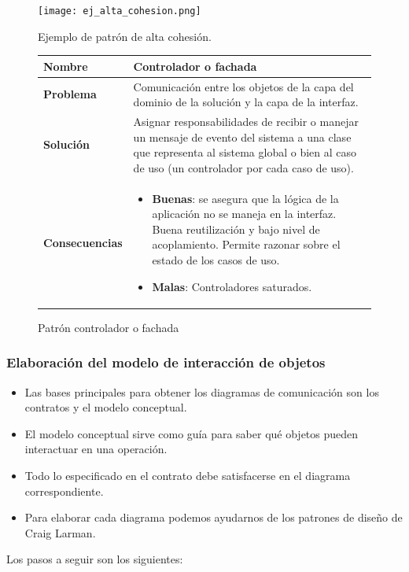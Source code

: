 \documentclass[12pt,spanish]{article}
\begin{document}
\begin{figure}[H]
\centering
\texttt{[image: ej\_alta\_cohesion.png]}
\caption{Ejemplo de patrón de alta cohesión.}
\end{figure}

\begin{figure}[H]
\centering
\begin{tabular}{|m{5cm}|m{8cm}|}
\hline
\textbf{Nombre} & Controlador o fachada\\
\hline
\textbf{Problema} & Comunicación entre los objetos de la capa del dominio de la solución y la capa de la interfaz.\\
\hline
\textbf{Solución} & Asignar responsabilidades de recibir o manejar un mensaje de evento del sistema a una clase que representa al sistema global o bien al caso de uso (un controlador por cada caso de uso).\\
\hline
\textbf{Consecuencias} & 
\begin{itemize}
	\item \textbf{Buenas}: se asegura que la lógica de la aplicación no se maneja en la interfaz. Buena reutilización y bajo nivel de acoplamiento. Permite razonar sobre el estado de los casos de uso.
	\item \textbf{Malas}: Controladores saturados.
\end{itemize}\\
\hline
\end{tabular}
\caption{Patrón controlador o fachada}
\end{figure}

\subsubsection{Elaboración del modelo de interacción de objetos}

\begin{itemize}
	\item Las bases principales para obtener los diagramas de comunicación son los contratos y el modelo conceptual.
	\item El modelo conceptual sirve como guía para saber qué objetos pueden interactuar en una operación.
	\item Todo lo especificado en el contrato debe satisfacerse en el diagrama correspondiente.
	\item Para elaborar cada diagrama podemos ayudarnos de los patrones de diseño de Craig Larman.
\end{itemize}

Los pasos a seguir son los siguientes:
\end{document}
